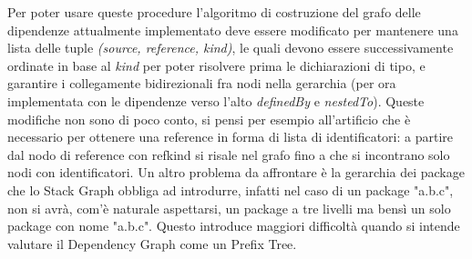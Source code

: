 Per poter usare queste procedure l'algoritmo di costruzione del grafo delle dipendenze attualmente implementato deve essere modificato per mantenere una lista delle tuple \emph{(source, reference, kind)}, le quali devono essere successivamente ordinate in base al \emph{kind} per poter risolvere prima le dichiarazioni di tipo, e garantire i collegamente bidirezionali fra nodi nella gerarchia (per ora implementata con le dipendenze verso l'alto \emph{definedBy} e \emph{nestedTo}). Queste modifiche non sono di poco conto, si pensi per esempio all'artificio che \`e necessario per ottenere una reference in forma di lista di identificatori: a partire dal nodo di reference con refkind si risale nel grafo fino a che si incontrano solo nodi con identificatori. Un altro problema da affrontare \`e la gerarchia dei package che lo Stack Graph obbliga ad introdurre, infatti nel caso di un package "a.b.c", non si avr\`a, com'\`e naturale aspettarsi, un package a tre livelli ma bens\`i un solo package con nome "a.b.c". Questo introduce maggiori difficolt\`a quando si intende valutare il Dependency Graph come un Prefix Tree.
